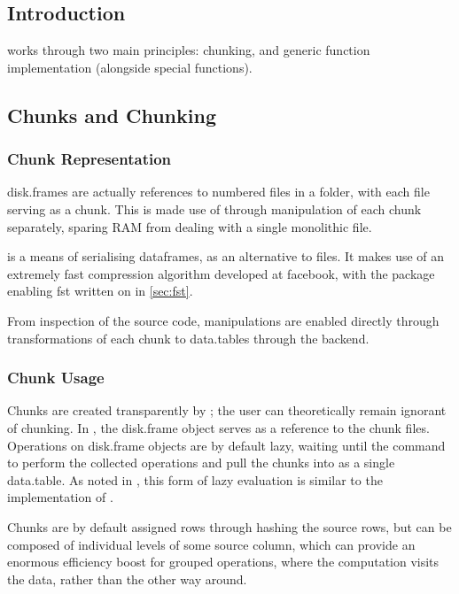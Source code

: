 \subsection{Introduction}\label{sec:disk-frame-introduction}

 works through two main principles: chunking, and generic function implementation (alongside special functions).

\subsection{Chunks and Chunking}\label{sec:chunking}

\subsubsection{Chunk Representation}\label{sec:chunk-representation}

disk.frames are actually references to numbered  files in a folder, with each file serving as a chunk.
This is made use of through manipulation of each chunk separately, sparing RAM from dealing with a single monolithic file\cite{zj19:_inges_data}.

 is a means of serialising dataframes, as an alternative to 
files\cite{klik19}.
It makes use of an extremely fast compression algorithm developed at facebook, with the \R{} package enabling fst written on in \cref{sec:fst}.

From inspection of the source code,  manipulations are enabled directly through transformations of each chunk to data.tables through the  backend.

\subsubsection{Chunk Usage}\label{sec:making-chunks}

Chunks are created transparently by ; the user can theoretically remain ignorant of chunking.
In \R{}, the disk.frame object serves as a reference to the chunk files.
Operations on disk.frame objects are by default lazy, waiting until the  command to perform the collected operations and pull the chunks into \R{} as a single data.table.
As noted in \cite{zj19:_simpl_verbs_lazy_evaluat}, this form of lazy evaluation is similar to the implementation of .

Chunks are by default assigned rows through hashing the source rows, but can be composed of individual levels of some source column, which can provide an enormous efficiency boost for grouped operations, where the computation visits the data, rather than the other way around.

